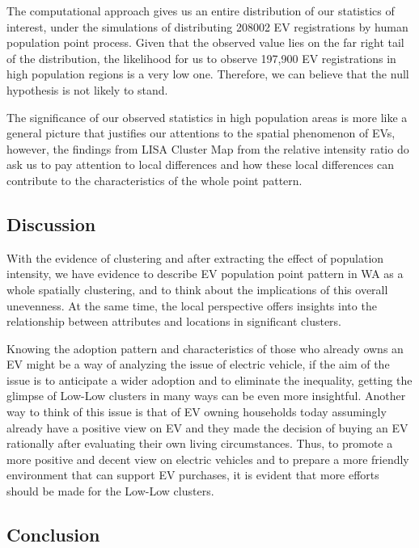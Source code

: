 \documentclass[
  letterpaper,
  DIV=11,
  numbers=noendperiod]{scrartcl}
\makeatletter
\newcommand*\pandocbounded[1]{%
  \sbox\pandoc@box{#1}%
  \Gscale@div\@tempa{\textheight}{\dimexpr\ht\pandoc@box+\dp\pandoc@box\relax}%
  \Gscale@div\@tempb{\linewidth}{\wd\pandoc@box}%
  \ifdim\@tempb\p@<\@tempa\p@\let\@tempa\@tempb\fi%
  \ifdim\@tempa\p@<\p@\scalebox{\@tempa}{\usebox\pandoc@box}%
  \else\usebox{\pandoc@box}%
  \fi%
}
\makeatother
\begin{document}
\pandocbounded{\texttt{[image: image/gpw-distribution.png]}}

The computational approach gives us an entire distribution of our
statistics of interest, under the simulations of distributing 208002 EV
registrations by human population point process. Given that the observed
value lies on the far right tail of the distribution, the likelihood for
us to observe 197,900 EV registrations in high population regions is a
very low one. Therefore, we can believe that the null hypothesis is not
likely to stand.

The significance of our observed statistics in high population areas is
more like a general picture that justifies our attentions to the spatial
phenomenon of EVs, however, the findings from LISA Cluster Map from the
relative intensity ratio do ask us to pay attention to local differences
and how these local differences can contribute to the characteristics of
the whole point pattern.

\subsection{Discussion}\label{discussion}

With the evidence of clustering and after extracting the effect of
population intensity, we have evidence to describe EV population point
pattern in WA as a whole spatially clustering, and to think about the
implications of this overall unevenness. At the same time, the local
perspective offers insights into the relationship between attributes and
locations in significant clusters.

Knowing the adoption pattern and characteristics of those who already
owns an EV might be a way of analyzing the issue of electric vehicle, if
the aim of the issue is to anticipate a wider adoption and to eliminate
the inequality, getting the glimpse of Low-Low clusters in many ways can
be even more insightful. Another way to think of this issue is that of
EV owning households today assumingly already have a positive view on EV
and they made the decision of buying an EV rationally after evaluating
their own living circumstances. Thus, to promote a more positive and
decent view on electric vehicles and to prepare a more friendly
environment that can support EV purchases, it is evident that more
efforts should be made for the Low-Low clusters.

\subsection{Conclusion}\label{conclusion}
\end{document}
